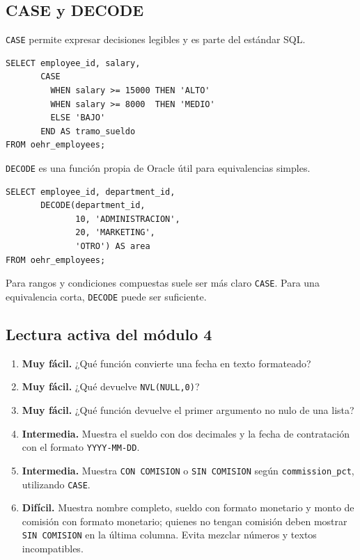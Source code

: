 \documentclass[11pt,a4paper]{article}
\newcommand{\campo}[1]{\texttt{#1}}
\newcommand{\nivel}[1]{\textbf{#1}}
\begin{document}
\subsection{CASE y DECODE}

\campo{CASE} permite expresar decisiones legibles y es parte del estándar SQL.

\begin{lstlisting}
SELECT employee_id, salary,
       CASE
         WHEN salary >= 15000 THEN 'ALTO'
         WHEN salary >= 8000  THEN 'MEDIO'
         ELSE 'BAJO'
       END AS tramo_sueldo
FROM oehr_employees;
\end{lstlisting}

\campo{DECODE} es una función propia de Oracle útil para equivalencias simples.

\begin{lstlisting}
SELECT employee_id, department_id,
       DECODE(department_id,
              10, 'ADMINISTRACION',
              20, 'MARKETING',
              'OTRO') AS area
FROM oehr_employees;
\end{lstlisting}

Para rangos y condiciones compuestas suele ser más claro \campo{CASE}. Para una equivalencia corta,
\campo{DECODE} puede ser suficiente.

\subsection{Lectura activa del módulo 4}

\begin{enumerate}[label=\textbf{M4.\arabic*}]
  \item \nivel{Muy fácil.} ¿Qué función convierte una fecha en texto formateado?
  \item \nivel{Muy fácil.} ¿Qué devuelve \campo{NVL(NULL,0)}?
  \item \nivel{Muy fácil.} ¿Qué función devuelve el primer argumento no nulo de una lista?
  \item \nivel{Intermedia.} Muestra el sueldo con dos decimales y la fecha de contratación con el
  formato \campo{YYYY-MM-DD}.
  \item \nivel{Intermedia.} Muestra \campo{CON COMISION} o \campo{SIN COMISION} según
  \campo{commission\_pct}, utilizando \campo{CASE}.
  \item \nivel{Difícil.} Muestra nombre completo, sueldo con formato monetario y monto de comisión
  con formato monetario; quienes no tengan comisión deben mostrar \campo{SIN COMISION} en la última
  columna. Evita mezclar números y textos incompatibles.
\end{enumerate}
\end{document}
